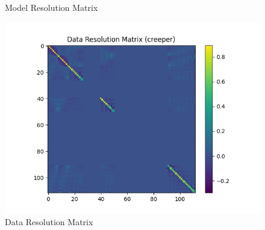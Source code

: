 \documentclass{article}
\begin{document}
\begin{itemize}
\begin{figure}[h]
    \caption{Model Resolution Matrix}
\end{figure}
\begin{figure}[h]
    \centering
    \includegraphics[width=1\textwidth]{images/outputs/datares/creeper.png}
    \caption{Data Resolution Matrix}
\end{figure}
\clearpage



\end{itemize}
\end{document}
